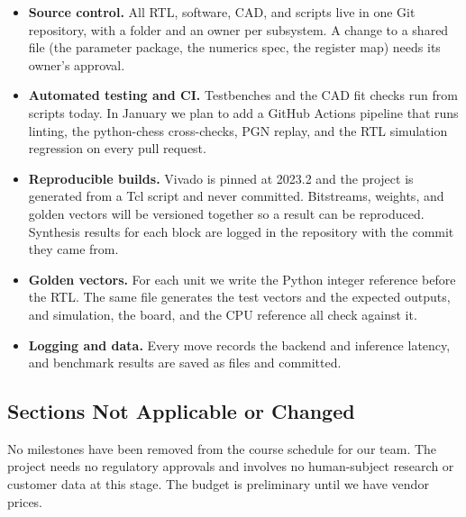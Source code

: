 \documentclass[10pt]{article}
\newcommand{\lead}[1]{\textbf{#1}}
\begin{document}
\begin{itemize}
\item \lead{Source control.} All RTL, software, CAD, and scripts live in one Git repository, with a
  folder and an owner per subsystem. A change to a shared file (the parameter package, the numerics
  spec, the register map) needs its owner's approval.
\item \lead{Automated testing and CI.} Testbenches and the CAD fit checks run from scripts today.
  In January we plan to add a GitHub Actions pipeline that runs linting, the python-chess
  cross-checks, PGN replay, and the RTL simulation regression on every pull request.
\item \lead{Reproducible builds.} Vivado is pinned at 2023.2 and the project is generated from a
  Tcl script and never committed. Bitstreams, weights, and golden vectors will be versioned
  together so a result can be reproduced. Synthesis results for each block are logged in the
  repository with the commit they came from.
\item \lead{Golden vectors.} For each unit we write the Python integer reference before the RTL.
  The same file generates the test vectors and the expected outputs, and simulation, the board, and
  the CPU reference all check against it.
\item \lead{Logging and data.} Every move records the backend and inference latency, and benchmark
  results are saved as files and committed.
\end{itemize}

\subsection{Sections Not Applicable or Changed}

No milestones have been removed from the course schedule for our team. The project needs no
regulatory approvals and involves no human-subject research or customer data at this stage. The
budget is preliminary until we have vendor prices.
\end{document}

